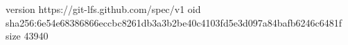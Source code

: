 version https://git-lfs.github.com/spec/v1
oid sha256:6e54e68386866eccbc8261db3a3b2be40c4103fd5e3d097a84bafb6246c6481f
size 43940

